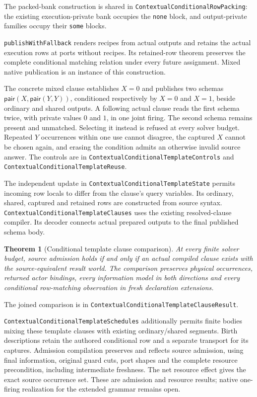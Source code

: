 \documentclass[11pt]{article}
\newtheorem{theorem}{Theorem}
\newcommand{\code}[1]{\texttt{\small #1}}
\begin{document}
The packed-bank construction is shared in
\code{ContextualConditionalRowPacking}: the existing execution-private bank
occupies the \code{none} block, and output-private families occupy their
\code{some} blocks.

\code{publishWithFallback} renders recipes from actual
outputs and retains the actual execution rows at ports without recipes.
Its retained-row theorem preserves the complete conditional matching
relation under every future assignment. Mixed native publication is an
instance of this construction.

The concrete mixed clause establishes $X=0$ and publishes two schemas
$\mathsf{pair}(X,\mathsf{pair}(Y,Y))$, conditioned respectively by $X=0$
and $X=1$, beside ordinary and shared outputs. A following actual clause
reads the first schema twice, with private values $0$ and $1$, in one
joint firing. The second schema remains present and unmatched. Selecting
it instead is refused at every solver budget. Repeated $Y$ occurrences
within one use cannot disagree, the captured $X$ cannot be chosen again,
and erasing the condition admits an otherwise invalid source answer.
The controls are in \code{ContextualConditionalTemplateControls} and
\code{ContextualConditionalTemplateReuse}.

The independent update in \code{ContextualConditionalTemplateState}
permits incoming row locals to differ from the clause's query variables.
Its ordinary, shared, captured and retained rows are constructed from
source syntax. \code{ContextualConditionalTemplateClauses} uses the
existing resolved-clause compiler. Its decoder connects actual prepared
outputs to the final published schema body.

\begin{theorem}[Conditional template clause comparison]
At every finite solver budget, source admission holds if and only if an
actual compiled clause exists with the source-equivalent result world.
The comparison preserves physical occurrences, returned actor bindings,
every information model in both directions and every conditional
row-matching observation in fresh declaration extensions.
\end{theorem}
The joined comparison is in
\code{ContextualConditionalTemplateClauseResult}.

\code{ContextualConditionalTemplateSchedules} additionally permits finite
bodies mixing these template clauses with existing ordinary/shared
segments. Birth descriptions retain the authored conditional row and a
separate transport for its captures. Admission compilation preserves and
reflects source admission, using final information, original guard cuts,
port shapes and the complete resource precondition, including intermediate
freshness. The net resource effect gives the exact source occurrence set.
These are admission and resource results; native one-firing realization
for the extended grammar remains open.
\end{document}
